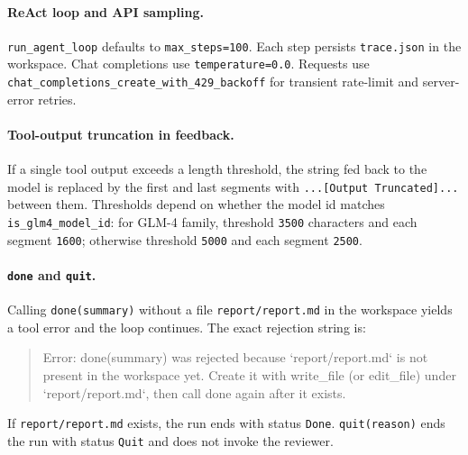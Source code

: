 \begin{AgentDetails}
  \paragraph{ReAct loop and API sampling.}
  \texttt{run\_agent\_loop} defaults to \texttt{max\_steps=100}. Each step persists \texttt{trace.json} in the workspace. Chat completions use \texttt{temperature=0.0}. Requests use \texttt{chat\_completions\_create\_with\_429\_backoff} for transient rate-limit and server-error retries.
  
  \paragraph{Tool-output truncation in feedback.}
  If a single tool output exceeds a length threshold, the string fed back to the model is replaced by the first and last segments with \texttt{...[Output Truncated]...} between them. Thresholds depend on whether the model id matches \texttt{is\_glm4\_model\_id}: for GLM-4 family, threshold \texttt{3500} characters and each segment \texttt{1600}; otherwise threshold \texttt{5000} and each segment \texttt{2500}.
  
  \paragraph{\texttt{done} and \texttt{quit}.}
  Calling \texttt{done(summary)} without a file \texttt{report/report.md} in the workspace yields a tool error and the loop continues. The exact rejection string is:
  \begin{quote}\small\ttfamily
  Error: done(summary) was rejected because `report/report.md` is not present in the workspace yet. Create it with write\_file (or edit\_file) under `report/report.md`, then call done again after it exists.
  \end{quote}
  If \texttt{report/report.md} exists, the run ends with status \texttt{Done}. \texttt{quit(reason)} ends the run with status \texttt{Quit} and does not invoke the reviewer.
  
  \end{AgentDetails}